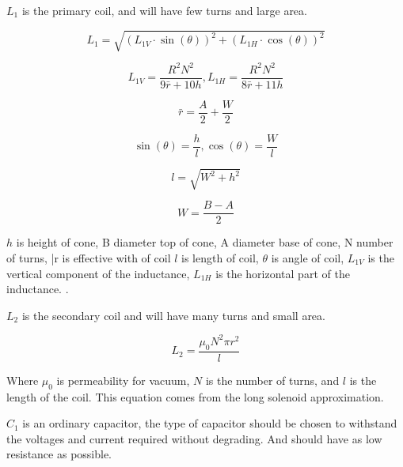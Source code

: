 $L_1$ is the primary coil, and will have few turns and large area.

\begin{equation} \label{eq:}
    L_1 = \sqrt{(L_{1V}\cdot \sin (\theta))^2 + (L_{1H}\cdot \cos (\theta))^2}
\end{equation}

\begin{equation} \label{eq:}
    L_{1V} = \frac{R^2 N^2}{9 \bar{r} + 10 h}, L_{1H} = \frac{R^2 N^2}{8 \bar{r} + 11 h}
\end{equation}


\begin{equation} \label{eq:}
    \bar{r} = \frac{A}{2} + \frac{W}{2}
\end{equation}

\begin{equation} \label{eq:}
    \sin (\theta) = \frac{h}{l}, \cos (\theta) = \frac{W}{l}
\end{equation}

\begin{equation} \label{eq:}
    l = \sqrt{W^2 + h^2}
\end{equation}

\begin{equation} \label{eq:}
    W = \frac{B - A}{2}
\end{equation}


$h$ is height of cone, B diameter top of cone, A diameter base of cone, N number of turns, \bar{r} is effective with of coil $l$ is length of coil, $\theta$ is angle of coil, $L_{1V}$ is the vertical component of the inductance, $L_{1H}$ is the horizontal part of the inductance. \citep{wheeler}.

$L_2$ is the secondary coil and will have many turns and small area.

\begin{equation} \label{eq:l2}
    L_2 = \frac{{\mu}_0 N^2 \pi {r}^2}{l}
\end{equation}

Where ${\mu}_0$ is permeability for vacuum, $N$ is the number of turns, and $l$ is the length of the coil. This equation comes from the long solenoid approximation.

$C_1$ is an ordinary capacitor, the type of capacitor should be chosen to withstand the voltages and current required without degrading. And should have as low resistance as possible.

